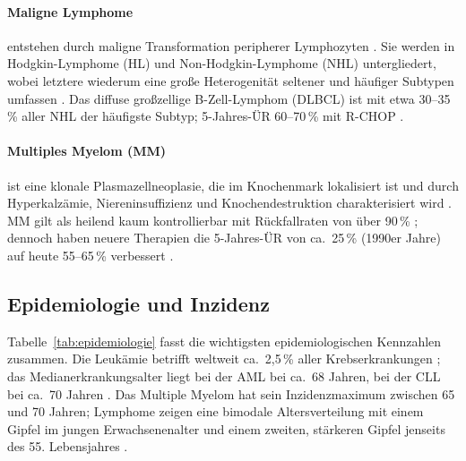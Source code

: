 ﻿\documentclass[12pt,a4paper]{article}
\theoremstyle{definition}
\begin{document}
\paragraph{Maligne Lymphome} entstehen durch maligne Transformation peripherer
Lymphozyten \cite{adeyemi2025}. Sie werden in Hodgkin-Lymphome (HL) und
Non-Hodgkin-Lymphome (NHL) untergliedert, wobei letztere wiederum eine große
Heterogenität seltener und häufiger Subtypen umfassen \cite{swerdlow2016}. Das diffuse
großzellige B-Zell-Lymphom (DLBCL) ist mit etwa 30--35\,\% aller NHL der häufigste
Subtyp; 5-Jahres-ÜR 60--70\,\% mit R-CHOP \cite{coiffier2002}.

\paragraph{Multiples Myelom (MM)} ist eine klonale Plasmazellneoplasie, die im
Knochenmark lokalisiert ist und durch Hyperkalzämie, Niereninsuffizienz und
Knochendestruktion charakterisiert wird \cite{palumbo2011}. MM gilt als heilend
kaum kontrollierbar mit Rückfallraten von über 90\,\% \cite{adeyemi2025}; dennoch
haben neuere Therapien die 5-Jahres-ÜR von ca.\ 25\,\% (1990er Jahre) auf heute
55--65\,\% verbessert \cite{kumar2017}.

\subsection{Epidemiologie und Inzidenz}

Tabelle~\ref{tab:epidemiologie} fasst die wichtigsten epidemiologischen Kennzahlen
zusammen. Die Leukämie betrifft weltweit ca.\ 2,5\,\% aller Krebserkrankungen
\cite{adeyemi2025}; das Medianerkrankungsalter liegt bei der AML bei ca.\ 68 Jahren,
bei der CLL bei ca.\ 70 Jahren \cite{deschler2006}. Das Multiple Myelom hat sein
Inzidenzmaximum zwischen 65 und 70 Jahren; Lymphome zeigen eine bimodale
Altersverteilung mit einem Gipfel im jungen Erwachsenenalter und einem zweiten,
stärkeren Gipfel jenseits des 55. Lebensjahres \cite{bray2018}.
\end{document}
